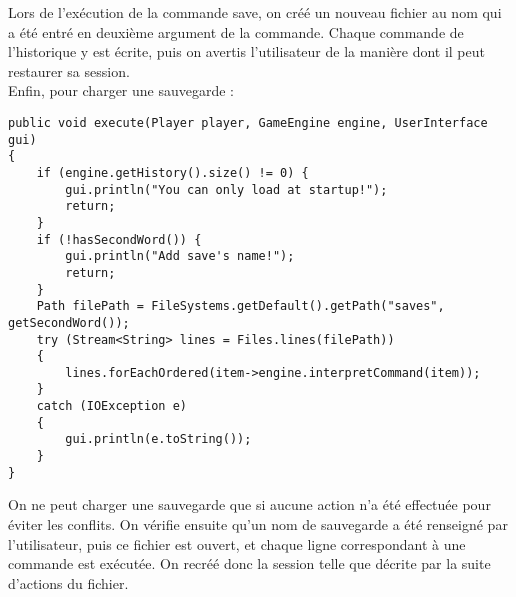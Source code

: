 \documentclass[11pt,a4paper]{report}
\begin{document}
Lors de l'exécution de la commande save, on créé un nouveau fichier au nom qui a été entré en deuxième argument de la commande. Chaque commande de l'historique y est écrite, puis on avertis l'utilisateur de la manière dont il peut restaurer sa session.\\
Enfin, pour charger une sauvegarde :
\begin{lstlisting}
public void execute(Player player, GameEngine engine, UserInterface gui)
{
    if (engine.getHistory().size() != 0) {
        gui.println("You can only load at startup!");
        return;
    }
    if (!hasSecondWord()) {
        gui.println("Add save's name!");
        return;
    }
    Path filePath = FileSystems.getDefault().getPath("saves", getSecondWord());
    try (Stream<String> lines = Files.lines(filePath))
    {
        lines.forEachOrdered(item->engine.interpretCommand(item));
    }
    catch (IOException e)
    {
        gui.println(e.toString());
    }
}
\end{lstlisting}
On ne peut charger une sauvegarde que si aucune action n'a été effectuée pour éviter les conflits. On vérifie ensuite qu'un nom de sauvegarde a été renseigné par l'utilisateur, puis ce fichier est ouvert, et chaque ligne correspondant à une commande est exécutée. On recréé donc la session telle que décrite par la suite d'actions du fichier.
\end{document}

